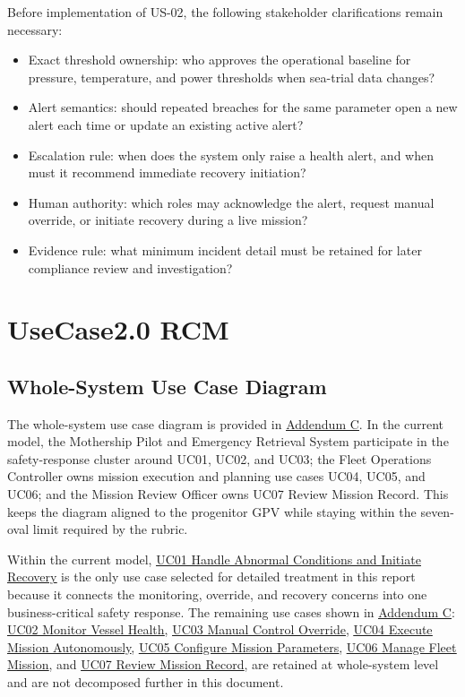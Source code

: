 \documentclass[10pt,a4paper]{article}
\let\orighyperref\hyperref
\renewcommand{\hyperref}[2][]{\orighyperref[#1]{\uline{#2}}}
\begin{document}
Before implementation of US-02, the following stakeholder clarifications remain necessary:

\begin{itemize}[leftmargin=*,nosep]
  \item Exact threshold ownership: who approves the operational baseline for pressure, temperature, and power thresholds when sea-trial data changes?
  \item Alert semantics: should repeated breaches for the same parameter open a new alert each time or update an existing active alert?
  \item Escalation rule: when does the system only raise a health alert, and when must it recommend immediate recovery initiation?
  \item Human authority: which roles may acknowledge the alert, request manual override, or initiate recovery during a live mission?
  \item Evidence rule: what minimum incident detail must be retained for later compliance review and investigation?
\end{itemize}

\section{UseCase2.0 RCM}
\label{sec:usecase-rcm}

\subsection*{Whole-System Use Case Diagram}
{}
\label{sec:uc-diagram}

The whole-system use case diagram is provided in \hyperref[add:uc-diagram]{Addendum C}. In the current model, the Mothership Pilot and Emergency Retrieval System participate in the safety-response cluster around UC01, UC02, and UC03; the Fleet Operations Controller owns mission execution and planning use cases UC04, UC05, and UC06; and the Mission Review Officer owns UC07 Review Mission Record. This keeps the diagram aligned to the progenitor GPV while staying within the seven-oval limit required by the rubric.

\noindent Within the current model, \hyperref[tab:priority-uc]{UC01 Handle Abnormal Conditions and Initiate Recovery} is the only use case selected for detailed treatment in this report because it connects the monitoring, override, and recovery concerns into one business-critical safety response. The remaining use cases shown in \hyperref[add:uc-diagram]{Addendum C}: \hyperref[add:uc-diagram]{UC02 Monitor Vessel Health}, \hyperref[add:uc-diagram]{UC03 Manual Control Override}, \hyperref[add:uc-diagram]{UC04 Execute Mission Autonomously}, \hyperref[add:uc-diagram]{UC05 Configure Mission Parameters}, \hyperref[add:uc-diagram]{UC06 Manage Fleet Mission}, and \hyperref[add:uc-diagram]{UC07 Review Mission Record}, are retained at whole-system level and are not decomposed further in this document.
\end{document}

